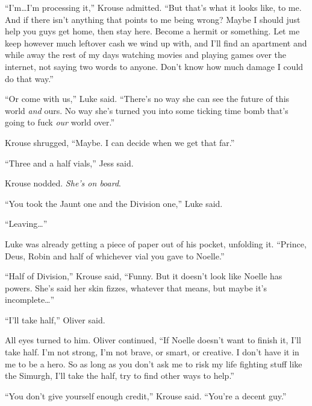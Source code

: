 ``I'm\ldots I'm processing it,'' Krouse admitted.  ``But that's what it looks like, to me.  And if there isn't anything that points to me being wrong?  Maybe I should just help you guys get home, then stay here.  Become a hermit or something.  Let me keep however much leftover cash we wind up with, and I'll find an apartment and while away the rest of my days watching movies and playing games over the internet, not saying two words to anyone.  Don't know how much damage I could do that way.''



``Or come with us,'' Luke said.  ``There's no way she can see the future of this world \emph{and} ours.  No way she's turned you into some ticking time bomb that's going to fuck \emph{our} world over.''



Krouse shrugged, ``Maybe.  I can decide when we get that far.''



``Three and a half vials,'' Jess said.



Krouse nodded.  \emph{She's on board}.



``You took the Jaunt one and the Division one,'' Luke said.



``Leaving\ldots''



Luke was already getting a piece of paper out of his pocket, unfolding it.  ``Prince, Deus, Robin and half of whichever vial you gave to Noelle.''



``Half of Division,'' Krouse said, ``Funny.  But it doesn't look like Noelle has powers.  She's said her skin fizzes, whatever that means, but maybe it's incomplete\ldots''



``I'll take half,'' Oliver said.



All eyes turned to him.  Oliver continued, ``If Noelle doesn't want to finish it, I'll take half.  I'm not strong, I'm not brave, or smart, or creative.  I don't have it in me to be a hero.  So as long as you don't ask me to risk my life fighting stuff like the Simurgh, I'll take the half, try to find other ways to help.''



``You don't give yourself enough credit,'' Krouse said.  ``You're a decent guy.''



